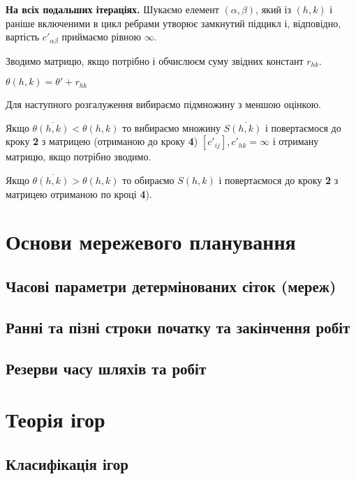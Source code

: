 \documentclass[12pt,a4paper]{book}
\newenvironment{slim_enumerate}{
\begin{enumerate}
  \setlength{\itemsep}{1pt}
  \setlength{\parskip}{0pt}
  \setlength{\parsep}{0pt}}
{\end{enumerate}}
\begin{document}
\begin{slim_enumerate}
\begin{slim_enumerate}
\begin{slim_enumerate}
{\bf На всіх подальших ітераціях.} Шукаємо елемент $(\alpha, \beta)$, який із $(h,k)$ і раніше включеними в цикл ребрами утворює замкнутий підцикл і, відповідно, вартість $c'_{\alpha \beta}$ приймаємо рівною $\infty$.

      \item Зводимо матрицю, якщо потрібно і обчислюєм суму звідних констант $r_{h k}$.
      \item $ \theta(h,k) = \theta' + r_{h k} $
    \end{slim_enumerate}
  \end{slim_enumerate}
  \item Для наступного розгалуження вибираємо підмножину з меншою оцінкою.
  \begin{slim_enumerate}
    \item Якщо $\theta\overline{(h,k)} < \theta(h,k)$ то вибираємо множину $S\overline{(h,k)}$ і повертаємося до кроку {\bf 2} з матрицею (отриманою до кроку {\bf 4}) $[c'_{ij}], c'_{h k}=\infty$ і отриману матрицю, якщо потрібно зводимо.
    \item Якщо $\theta\overline{(h,k)} > \theta(h,k)$ то обираємо $S(h,k)$ і повертаємося до кроку {\bf 2} з матрицею отриманою по кроці {\bf 4}).
  \end{slim_enumerate}
\end{slim_enumerate}

\chapter{Основи мережевого планування}
\section{Часові параметри детермінованих сіток (мереж)}
\section{Ранні та пізні строки початку та закінчення робіт}
\section{Резерви часу шляхів та робіт}
\chapter{Теорія ігор}
\section{Класифікація ігор}
\end{document}
